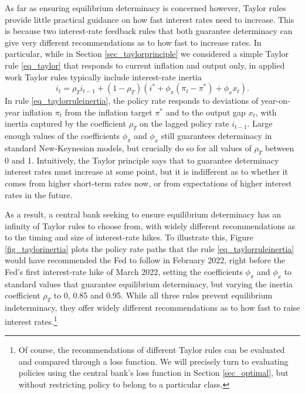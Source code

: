 \documentclass{article}
\begin{document}
As far as ensuring equilibrium determinacy is concerned however, Taylor rules provide little practical guidance on how fast interest rates need to increase. This is because two interest-rate feedback rules that both guarantee determinacy can give very different recommendations as to how fast to increase rates. In particular, while in Section \ref{sec_taylorprinciple} we considered a simple Taylor rule \eqref{eq_taylor} that responds to current inflation and output only, in applied work Taylor rules typically include interest-rate inertia
\begin{equation}
i_t = \rho_T i_{t-1} + (1-\rho_T) ( i^* + \phi_{\pi} (\pi_t-\pi^*) + \phi_x x_t ).\label{eq_taylorruleinertia}
\end{equation}
In rule \eqref{eq_taylorruleinertia}, the policy rate responds to deviations of year-on-year inflation $\pi_t$ from the inflation target $\pi^*$ and to the output gap $x_t$, with inertia captured by the coefficient $\rho_T$ on the lagged policy rate $i_{t-1}$. Large enough values of the coefficients $\phi_{\pi}$ and $\phi_x$ still guarantees determinacy in standard New-Keynesian models, but crucially do so for all values of $\rho_T$ between 0 and 1. Intuitively, the Taylor principle says that to guarantee determinacy interest rates must increase at some point, but it is indifferent as to whether it comes from higher short-term rates now, or from expectations of higher interest rates in the future.

As a result, a central bank seeking to ensure equilibrium determinacy has an infinity of Taylor rules to choose from, with widely different recommendations as to the timing and size of interest-rate hikes. To illustrate this, Figure \ref{fig_taylorinertia} plots the policy rate paths that the rule \eqref{eq_taylorruleinertia} would have recommended the Fed to follow in February 2022, right before the Fed's first interest-rate hike of March 2022, setting the coefficients $\phi_{\pi}$ and $\phi_x$ to standard values that guarantee equilibrium determinacy, but varying the inertia coefficient $\rho_T$ to 0, 0.85 and 0.95. While all three rules prevent equilibrium indeterminacy, they offer widely different recommendations as to how fast to raise interest rates.\footnote{Of course, the recommendations of different Taylor rules can be evaluated and compared through a loss function. We will precisely turn to evaluating policies using the central bank's loss function in Section \ref{sec_optimal}, but without restricting policy to belong to a particular class.}
\end{document}
